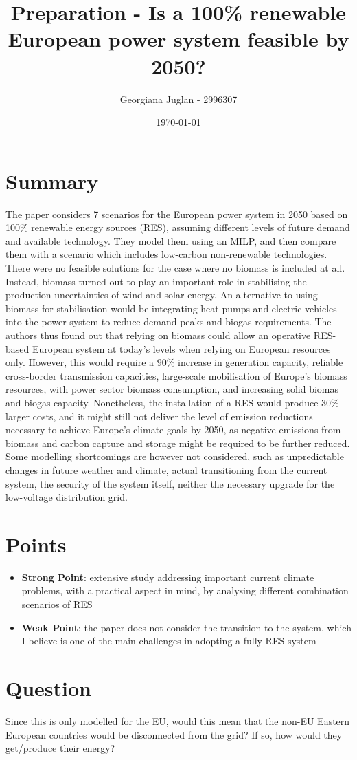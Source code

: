 \documentclass[11pt]{article}
\title{Preparation - Is a 100\% renewable European power system feasible by 2050?}
\author{Georgiana Juglan - 2996307}
\date{\today}
\begin{document}
\maketitle

\section{Summary}
The paper considers 7 scenarios for the European power system in 2050 based on 100\% renewable energy sources (RES), assuming different levels of future demand and available technology. They model them using an MILP, and then compare them with a scenario which includes low-carbon non-renewable technologies. There were no feasible solutions for the case where no biomass is included at all. Instead, biomass turned out to play an important role in stabilising the production uncertainties of wind and solar energy. An alternative to using biomass for stabilisation would be integrating heat pumps and electric vehicles into the power system to reduce demand peaks and biogas requirements. The authors thus found out that relying on biomass could allow an operative RES-based European system at today's levels when relying on European resources only. However, this would require a 90\% increase in generation capacity, reliable cross-border transmission capacities, large-scale mobilisation of Europe's biomass resources, with power sector biomass consumption, and increasing solid biomas and biogas capacity. Nonetheless, the installation of a RES would produce 30\% larger costs, and it might still not deliver the level of emission reductions necessary to achieve Europe's climate goals by 2050, as negative emissions from biomass and carbon capture and storage might be required to be further reduced. Some modelling shortcomings are however not considered, such as unpredictable changes in future weather and climate, actual transitioning from the current system, the security of the system itself, neither the necessary upgrade for the low-voltage distribution grid.

\section{Points}
    \begin{itemize}
        \item \textbf{Strong Point}: extensive study addressing important current climate problems, with a practical aspect in mind, by analysing different combination scenarios of RES
        \item \textbf{Weak Point}: the paper does not consider the transition to the system, which I believe is one of the main challenges in adopting a fully RES system
    \end{itemize}

\section{Question}
Since this is only modelled for the EU, would this mean that the non-EU Eastern European countries would be disconnected from the grid? If so, how would they get/produce their energy?
\end{document}
